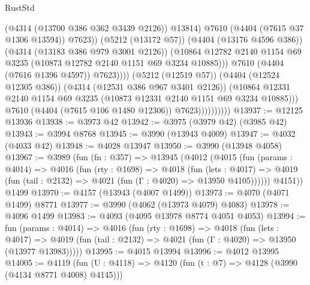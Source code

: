 \begin{lexlean}{RustStd}
\begin{coremodule}
{\begin{coremodule}
{{{{{{{{{{{{{{{{                                          (@4314 (@13700 @386 @362 @3439 @2126))
                                          @13814)
                                        @7610
                                        (@4404 (@7615 @37 @1306 @13594))
                                        @7623))
                                    (@5212 (@13172 @57))
                                    (@4404 (@13176 @4596 @386))
                                    (@4314 (@13183 @386 @979 @3001 @2126))
                                    (@10864
                                      @12782
                                      @2140
                                      @1154
                                      @69
                                      @3235
                                      (@10873 @12782 @2140 @1151 @69 @3234 @10885)))
                                  @7610
                                  (@4404 (@7616 @1396 @4597))
                                  @7623))))
                          (@5212 (@12519 @57))
                          (@4404 (@12524 @12305 @386))
                          (@4314 (@12531 @386 @967 @3401 @2126))
                          (@10864
                            @12331
                            @2140
                            @1154
                            @69
                            @3235
                            (@10873 @12331 @2140 @1151 @69 @3234 @10885)))
                        @7610
                        (@4404 (@7615 @106 @1480 @12306))
                        @7623))))))))))
@13937 := @12125 @13936
@13938 := @3973 @42
@13942 := @3975 (@3979 @42) (@3985 @42)
@13943 := @3994 @8768
@13945 := @3990 (@13943 @4009)
@13947 := @4032 (@4033 @42)
@13948 := @4028 @13947
@13950 := @3990 (@13948 @4058)
@13967 := @3989
    (fun (fn : @357) =>
    @13945
      (@4012
        (@4015
          (fun (params : @4014) =>
          @4016
            (fun (rty : @1698) =>
            @4018
              (fun (lets : @4017) =>
              @4019 (fun (tail : @2132) => @4021 (fun (Γ : @4020) => @13950 @4105))))))
        @4151))
    @1499
@13970 := @4157 (@13943 (@4007 @1499))
@13973 := @4070 (@4071 @1499) @8771
@13977 := @3990 (@4062 (@13973 @4079) @4083)
@13978 := @4096 @1499
@13983 := @4093 (@4095 @13978 @8774 @4051 @4053)
@13994 := fun (params : @4014) =>
  @4016
    (fun (rty : @1698) =>
    @4018
      (fun (lets : @4017) =>
      @4019 (fun (tail : @2132) => @4021 (fun (Γ : @4020) => @13950 (@13977 @13983)))))
@13995 := @4015 @13994
@13996 := @4012 @13995
@14005 := @4119 (fun (U : @4118) => @4120 (fun (t : @7) => @4128 (@3990 (@4134 @8771 @4008) @4145)))
}}}}}}}}}}}}}}}}
\end{coremodule}}
\end{coremodule}
\end{lexlean}
